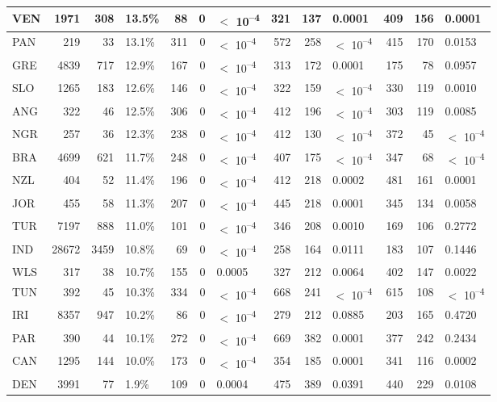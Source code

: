 \begin{tabular}{l|r|r|l|r|r|l|r|r|l|r|r|l}
\hline
VEN & 1971 & 308 & 13.5\% & 88 & 0 & $<$ 10\textsuperscript{--4} & 321 & 137 & 0.0001 & 409 & 156 & 0.0001\\
\hline
PAN & 219 & 33 & 13.1\% & 311 & 0 & $<$ 10\textsuperscript{--4} & 572 & 258 & $<$ 10\textsuperscript{--4} & 415 & 170 & 0.0153\\
\hline
GRE & 4839 & 717 & 12.9\% & 167 & 0 & $<$ 10\textsuperscript{--4} & 313 & 172 & 0.0001 & 175 & 78 & 0.0957\\
\hline
SLO & 1265 & 183 & 12.6\% & 146 & 0 & $<$ 10\textsuperscript{--4} & 322 & 159 & $<$ 10\textsuperscript{--4} & 330 & 119 & 0.0010\\
\hline
ANG & 322 & 46 & 12.5\% & 306 & 0 & $<$ 10\textsuperscript{--4} & 412 & 196 & $<$ 10\textsuperscript{--4} & 303 & 119 & 0.0085\\
\hline
NGR & 257 & 36 & 12.3\% & 238 & 0 & $<$ 10\textsuperscript{--4} & 412 & 130 & $<$ 10\textsuperscript{--4} & 372 & 45 & $<$ 10\textsuperscript{--4}\\
\hline
BRA & 4699 & 621 & 11.7\% & 248 & 0 & $<$ 10\textsuperscript{--4} & 407 & 175 & $<$ 10\textsuperscript{--4} & 347 & 68 & $<$ 10\textsuperscript{--4}\\
\hline
NZL & 404 & 52 & 11.4\% & 196 & 0 & $<$ 10\textsuperscript{--4} & 412 & 218 & 0.0002 & 481 & 161 & 0.0001\\
\hline
JOR & 455 & 58 & 11.3\% & 207 & 0 & $<$ 10\textsuperscript{--4} & 445 & 218 & 0.0001 & 345 & 134 & 0.0058\\
\hline
TUR & 7197 & 888 & 11.0\% & 101 & 0 & $<$ 10\textsuperscript{--4} & 346 & 208 & 0.0010 & 169 & 106 & 0.2772\\
\hline
IND & 28672 & 3459 & 10.8\% & 69 & 0 & $<$ 10\textsuperscript{--4} & 258 & 164 & 0.0111 & 183 & 107 & 0.1446\\
\hline
WLS & 317 & 38 & 10.7\% & 155 & 0 & 0.0005 & 327 & 212 & 0.0064 & 402 & 147 & 0.0022\\
\hline
TUN & 392 & 45 & 10.3\% & 334 & 0 & $<$ 10\textsuperscript{--4} & 668 & 241 & $<$ 10\textsuperscript{--4} & 615 & 108 & $<$ 10\textsuperscript{--4}\\
\hline
IRI & 8357 & 947 & 10.2\% & 86 & 0 & $<$ 10\textsuperscript{--4} & 279 & 212 & 0.0885 & 203 & 165 & 0.4720\\
\hline
PAR & 390 & 44 & 10.1\% & 272 & 0 & $<$ 10\textsuperscript{--4} & 669 & 382 & 0.0001 & 377 & 242 & 0.2434\\
\hline
CAN & 1295 & 144 & 10.0\% & 173 & 0 & $<$ 10\textsuperscript{--4} & 354 & 185 & 0.0001 & 341 & 116 & 0.0002\\
\hline
DEN & 3991 & 77 & 1.9\% & 109 & 0 & 0.0004 & 475 & 389 & 0.0391 & 440 & 229 & 0.0108\\
\hline
\end{tabular}
